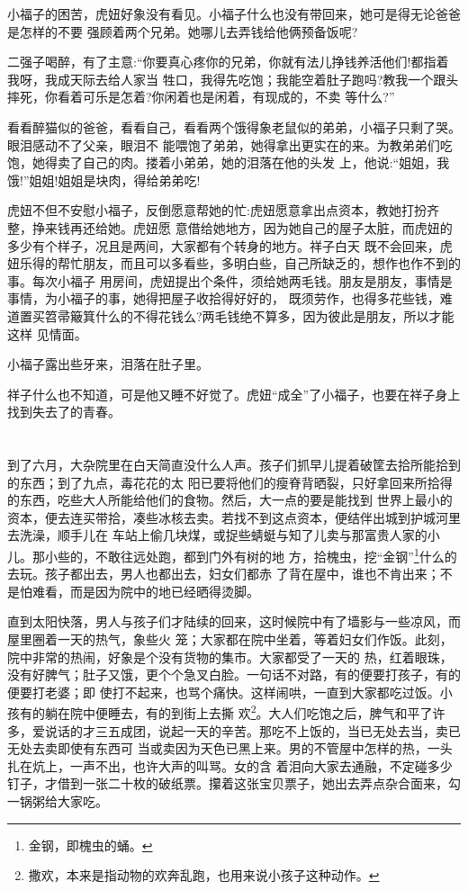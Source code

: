 \documentclass[11pt,a4paper,onecolumn]{article}
\begin{document}
小福子的困苦，虎妞好象没有看见。小福子什么也没有带回来，她可是得\myrule 无论爸爸是怎样的不要
强\myrule 顾着两个兄弟。她哪儿去弄钱给他俩预备饭呢?

二强子喝醉，有了主意:``你要真心疼你的兄弟，你就有法儿挣钱养活他们!都指着我呀，我成天际去给人家当
牲口，我得先吃饱；我能空着肚子跑吗?教我一个跟头摔死，你看着可乐是怎着?你闲着也是闲着，有现成的，不卖
等什么?''

看看醉猫似的爸爸，看看自己，看看两个饿得象老鼠似的弟弟，小福子只剩了哭。眼泪感动不了父亲，眼泪不
能喂饱了弟弟，她得拿出更实在的来。为教弟弟们吃饱，她得卖了自己的肉。搂着小弟弟，她的泪落在他的头发
上，他说:``姐姐，我饿!''姐姐!姐姐是块肉，得给弟弟吃!

虎妞不但不安慰小福子，反倒愿意帮她的忙:虎妞愿意拿出点资本，教她打扮齐整，挣来钱再还给她。虎妞愿
意借给她地方，因为她自己的屋子太脏，而虎妞的多少有个样子，况且是两间，大家都有个转身的地方。祥子白天
既不会回来，虎妞乐得的帮忙朋友，而且可以多看些，多明白些，自己所缺乏的，想作也作不到的事。每次小福子
用房间，虎妞提出个条件，须给她两毛钱。朋友是朋友，事情是事情，为小福子的事，她得把屋子收拾得好好的，
既须劳作，也得多花些钱，难道置买笤帚簸箕什么的不得花钱么?两毛钱绝不算多，因为彼此是朋友，所以才能这样
见情面。

小福子露出些牙来，泪落在肚子里。

祥子什么也不知道，可是他又睡不好觉了。虎妞``成全''了小福子，也要在祥子身上找到失去了的青春。


\pagebreak
\section{}

到了六月，大杂院里在白天简直没什么人声。孩子们抓早儿提着破筐去拾所能拾到的东西；到了九点，毒花花的太
阳已要将他们的瘦脊背晒裂，只好拿回来所拾得的东西，吃些大人所能给他们的食物。然后，大一点的要是能找到
世界上最小的资本，便去连买带拾，凑些冰核去卖。若找不到这点资本，便结伴出城到护城河里去洗澡，顺手儿在
车站上偷几块煤，或捉些蜻蜓与知了儿卖与那富贵人家的小儿。那小些的，不敢往远处跑，都到门外有树的地
方，拾槐虫，挖``金钢''\footnote{金钢，即槐虫的蛹。}什么的去玩。孩子都出去，男人也都出去，妇女们都赤
了背在屋中，谁也不肯出来；不是怕难看，而是因为院中的地已经晒得烫脚。

直到太阳快落，男人与孩子们才陆续的回来，这时候院中有了墙影与一些凉风，而屋里圈着一天的热气，象些火
笼；大家都在院中坐着，等着妇女们作饭。此刻，院中非常的热闹，好象是个没有货物的集市。大家都受了一天的
热，红着眼珠，没有好脾气；肚子又饿，更个个急叉白脸。一句话不对路，有的便要打孩子，有的便要打老婆；即
使打不起来，也骂个痛快。这样闹哄，一直到大家都吃过饭。小孩有的躺在院中便睡去，有的到街上去撕
欢\footnote{撒欢，本来是指动物的欢奔乱跑，也用来说小孩子这种动作。}。大人们吃饱之后，脾气和平了许
多，爱说话的才三五成团，说起一天的辛苦。那吃不上饭的，当已无处去当，卖已无处去卖\myrule 即使有东西可
当或卖\myrule 因为天色已黑上来。男的不管屋中怎样的热，一头扎在炕上，一声不出，也许大声的叫骂。女的含
着泪向大家去通融，不定碰多少钉子，才借到一张二十枚的破纸票。攥着这张宝贝票子，她出去弄点杂合面来，勾
一锅粥给大家吃。
\end{document}
